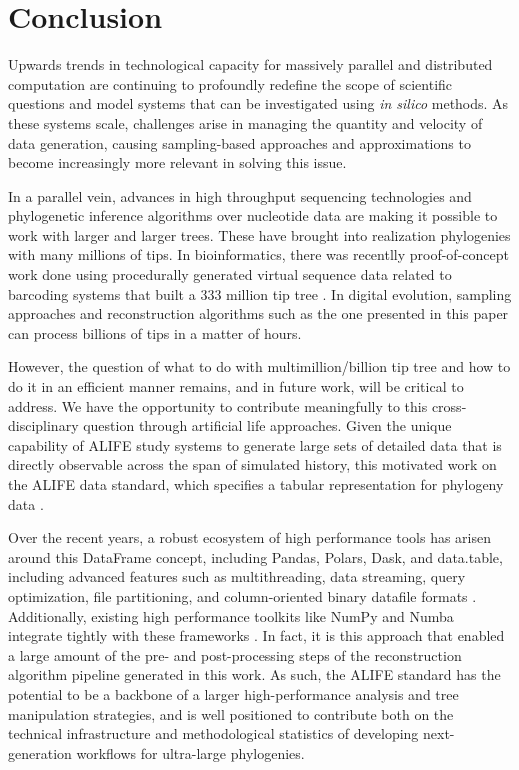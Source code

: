 \section{Conclusion} \label{sec:conclusion}

Upwards trends in technological capacity for massively parallel and distributed computation are continuing to profoundly redefine the scope of scientific questions and model systems that can be investigated using \textit{in silico} methods.
As these systems scale, challenges arise in managing the quantity and velocity of data generation, causing sampling-based approaches and approximations to become increasingly more relevant in solving this issue.

In a parallel vein, advances in high throughput sequencing technologies and phylogenetic inference algorithms over nucleotide data are making it possible to work with larger and larger trees.
These have brought into realization phylogenies with many millions of tips.
In bioinformatics, there was recentlly proof-of-concept work done using procedurally generated virtual sequence data related to barcoding systems that built a 333 million tip tree \citep{konno2022deep}.
In digital evolution, sampling approaches and reconstruction algorithms such as the one presented in this paper can process billions of tips in a matter of hours.

However, the question of what to do with multimillion/billion tip tree and how to do it in an efficient manner remains, and in future work, will be critical to address.
We have the opportunity to contribute meaningfully to this cross-disciplinary question through artificial life approaches.
Given the unique capability of ALIFE study systems to generate large sets of detailed data that is directly observable across the span of simulated history, this motivated work on the ALIFE data standard, which specifies a tabular representation for phylogeny data \citep{Lalejini2019data}.

Over the recent years, a robust ecosystem of high performance tools has arisen around this DataFrame concept, including Pandas, Polars, Dask, and data.table, including advanced features such as multithreading, data streaming, query optimization, file partitioning, and column-oriented binary datafile formats \citep{mckinney2010data,datatable,vink2024polars,rocklin2015dask}.
Additionally, existing high performance toolkits like NumPy and Numba integrate tightly with these frameworks \citep{Harris2020array,lam2015numba}.
In fact, it is this approach that enabled a large amount of the pre- and post-processing steps of the reconstruction algorithm pipeline generated in this work.
As such, the ALIFE standard has the potential to be a backbone of a larger high-performance analysis and tree manipulation strategies, and is well positioned to contribute both on the technical infrastructure and methodological statistics of developing next-generation workflows for ultra-large phylogenies.

